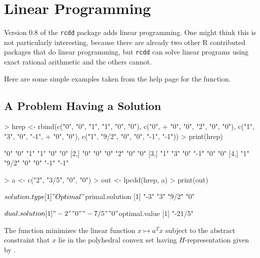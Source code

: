 \documentclass{article}
\begin{document}
\section{Linear Programming}

Version 0.8 of the \texttt{rcdd} package adds linear programming.
One might think this is not particularly interesting, because there
are already two other R contributed packages that do linear programming,
but \texttt{rcdd} can solve linear programs using exact rational arithmetic
and the others cannot.

Here are some simple examples taken from the help page for the 
function.

\subsection{A Problem Having a Solution}

\begin{Schunk}
\begin{Sinput}
> hrep <- rbind(c("0", "0", "1", "1", "0", "0"), c("0", 
+     "0", "0", "2", "0", "0"), c("1", "3", "0", "-1", 
+     "0", "0"), c("1", "9/2", "0", "0", "-1", "-1"))
> print(hrep)
\end{Sinput}
\begin{Soutput}
     [,1] [,2]  [,3] [,4] [,5] [,6]
[1,] "0"  "0"   "1"  "1"  "0"  "0" 
[2,] "0"  "0"   "0"  "2"  "0"  "0" 
[3,] "1"  "3"   "0"  "-1" "0"  "0" 
[4,] "1"  "9/2" "0"  "0"  "-1" "-1"
\end{Soutput}
\begin{Sinput}
> a <- c("2", "3/5", "0", "0")
> out <- lpcdd(hrep, a)
> print(out)
\end{Sinput}
\begin{Soutput}
$solution.type
[1] "Optimal"

$primal.solution
[1] "-3"  "3"   "9/2" "0"  

$dual.solution
[1] "-2"   "0"    "-7/5" "0"   

$optimal.value
[1] "-21/5"
\end{Soutput}
\end{Schunk}

The function \verb@lpcdd@ minimizes the linear function $x \mapsto a^T x$
subject to the abstract constraint that $x$ lie in the polyhedral convex
set having $H$-representation given by \verb@hrep@.
\end{document}
